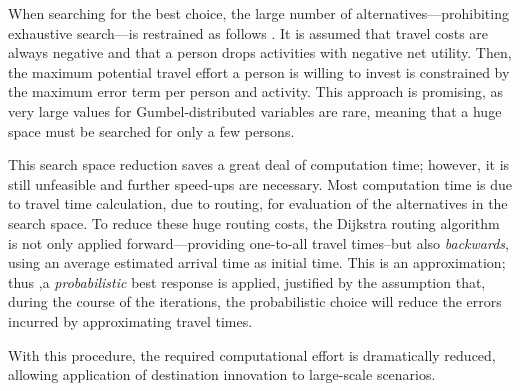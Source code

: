 When searching for the best choice, the large number of alternatives---prohibiting exhaustive search---is restrained as follows \citep[for the detailed derivation see][p.51 ff.]{Horni_PhDThesis_2013}. It is assumed that travel costs are always negative and that a person drops activities with negative net utility. Then, the maximum potential travel effort a person is willing to invest is constrained by the maximum error term per person and activity. This approach is promising, as very large values for Gumbel-distributed variables are rare, meaning that a huge space must be searched for only a few persons. 

This search space reduction saves a great deal of computation time; however, it is still unfeasible and further speed-ups are necessary. Most computation time is due to travel time calculation, \ie due to routing, for evaluation of the alternatives in the search space. To reduce these huge routing costs, the Dijkstra \citep[][]{Dijkstra_NM_1959}
routing algorithm is not only applied forward---providing one-to-all travel times--but also \emph{backwards}, using an average estimated arrival time as initial time. This is an approximation; thus ,a \emph{probabilistic} best response is applied, justified by the 
assumption that, during the course of the iterations, the probabilistic choice 
will reduce
the errors incurred by approximating travel times. 

With this procedure, the required computational effort is dramatically reduced, allowing application of destination innovation to large-scale scenarios.

